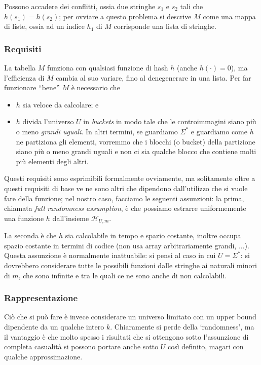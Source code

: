 Possono accadere dei conflitti, ossia due stringhe $s_1$ e $s_2$ tali che
$h(s_1) = h(s_2)$; per ovviare a questo problema si descrive $M$ come una mappa di liste, ossia
ad un indice $h_1$ di $M$ corrisponde una lista di stringhe.

\subsubsection{Requisiti}
La tabella $M$ funziona con qualsiasi funzione di hash $h$ (anche $h(\cdot) = 0$),
ma l'efficienza di $M$ cambia al suo variare, fino al denegenerare in una lista.
Per far funzionare ``bene'' $M$ è necessario che
\begin{itemize}
	\setlength\itemsep{0pt}
	\item $h$ sia veloce da calcolare; e
	\item $h$ divida l'universo $U$ in \textit{buckets} in modo tale che le
	      controimmagini siano più o meno \textit{grandi uguali}.
	      In altri termini, se guardiamo $\Sigma^*$ e guardiamo come
	      $h$ ne partiziona gli elementi, vorremmo che i blocchi (o bucket)
	      della partizione siano più o meno grandi uguali e non ci sia
	      qualche blocco che contiene molti più elementi degli
	      altri.
\end{itemize}
Questi requisiti sono esprimibili formalmente ovviamente, ma solitamente oltre
a questi requisiti di base ve ne sono altri che dipendono dall'utilizzo
che si vuole fare della funzione; nel nostro caso, facciamo le seguenti
assunzioni: la prima, chiamata \textit{full randomness assumption},
è che possiamo estrarre uniformemente una funzione $h$ dall'insieme $\mathcal{H}_{U,m}$.

La seconda è che $h$ sia calcolabile in tempo e spazio costante, inoltre occupa
spazio costante in termini di codice (non usa array arbitrariamente grandi, ...).
Questa assunzione è normalmente inattuabile: si pensi al caso in cui $U = \Sigma^*$:
si dovrebbero considerare tutte le possibili funzioni dalle stringhe ai naturali
minori di $m$, che sono infinite e tra le quali ce ne sono anche di non calcolabili.

\subsubsection{Rappresentazione}
Ciò che si può fare è invece considerare un universo limitato con un
upper bound dipendente da un qualche intero $k$.
Chiaramente si perde della `randomness', ma il vantaggio è che molto spesso
i risultati che si ottengono sotto l'assunzione di completa casualità si possono
portare anche sotto $U$ così definito, magari con qualche approssimazione.

